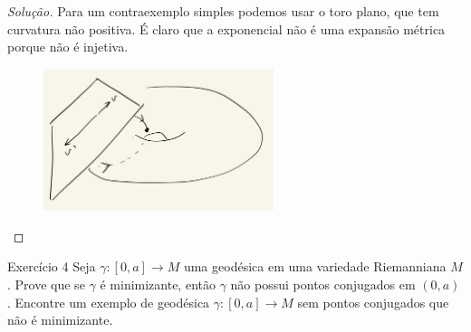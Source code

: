 \begin{proof}[Solução]
Para um contraexemplo simples podemos usar o toro plano, que tem curvatura não positiva. É claro que a exponencial não é uma expansão métrica porque não é injetiva.
\begin{figure}[H]
	\centering
	\includegraphics[width=0.6\textwidth]{fig12}
\end{figure}
\end{proof}

\begin{thing6}{Exercício 4}\label{exer:4}\leavevmode
	Seja \(\gamma:[0,a] \to M\) uma geodésica em uma variedade Riemanniana \(M\). Prove que se \(\gamma\) é minimizante, então \(\gamma\) não possui pontos conjugados em \((0,a)\). Encontre um exemplo de geodésica \(\gamma:[0,a] \to M\) sem pontos conjugados que não é minimizante.
\end{thing6}

